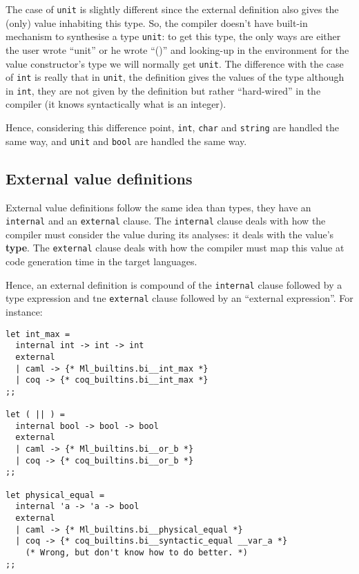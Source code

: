 The case of {\tt unit} is slightly different since the external
definition also gives the (only) value inhabiting this type. So, the
compiler doesn't have built-in mechanism to synthesise a type
{\tt unit}: to get this type, the only ways are either the user wrote
``unit'' or he wrote ``()'' and looking-up in the environment for the
value constructor's type we will normally get {\tt unit}. The
difference with the case of {\tt int} is really that in {\tt unit},
the definition gives the values of the type although in {\tt int},
they are not given by the definition but rather ``hard-wired'' in the
compiler (it knows syntactically what is an integer).

Hence, considering this difference point, {\tt int}, {\tt char} and
{\tt string} are handled the same way, and {\tt unit} and {\tt bool}
are handled the same way.



\subsection{External value definitions}
\label{external-type-definition}
External value definitions follow the same idea than types, they have
an {\tt internal} and an {\tt external} clause. The {\tt internal}
clause deals with how the compiler must consider the value during its
analyses: it deals with the value's {\bf type}. The {\tt external}
clause deals with how the compiler must map this value at code
generation time in the target languages.

Hence, an external definition is compound of the {\tt internal} clause
followed by a type expression and tne {\tt external} clause followed
by an ``external expression''. For instance:

{\footnotesize
\begin{lstlisting}[title=External value definitions]
let int_max =
  internal int -> int -> int
  external
  | caml -> {* Ml_builtins.bi__int_max *}
  | coq -> {* coq_builtins.bi__int_max *}
;;

let ( || ) =
  internal bool -> bool -> bool
  external
  | caml -> {* Ml_builtins.bi__or_b *}
  | coq -> {* coq_builtins.bi__or_b *}
;;

let physical_equal =
  internal 'a -> 'a -> bool
  external
  | caml -> {* Ml_builtins.bi__physical_equal *}
  | coq -> {* coq_builtins.bi__syntactic_equal __var_a *}
    (* Wrong, but don't know how to do better. *)
;;
\end{lstlisting}
}

